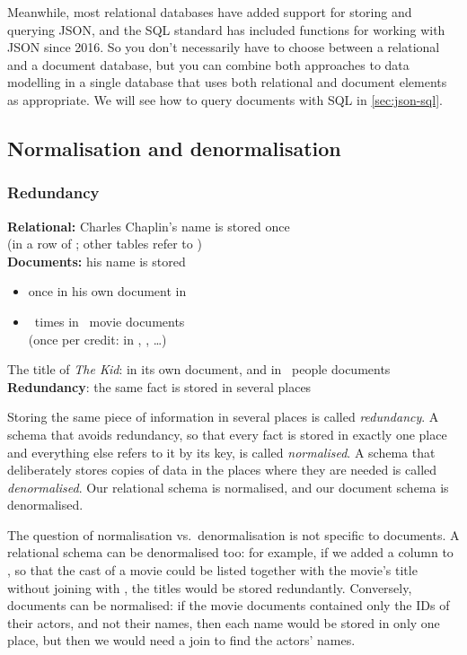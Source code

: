 Meanwhile, most relational databases have added support for storing and querying JSON, and the SQL standard has included functions for working with JSON since 2016.
So you don't necessarily have to choose between a relational and a document database, but you can combine both approaches to data modelling in a single database that uses both relational and document elements as appropriate.
We will see how to query documents with SQL in \autoref{sec:json-sql}.

\subsection{Normalisation and denormalisation}\label{sec:normalisation}

\begin{frame}
    \label{s:redundancy}
    \frametitle{Redundancy}
    \textbf{Relational:} Charles Chaplin's name is stored once\\
    (in a row of ; other tables refer to )\\[1em]\pause
    \textbf{Documents:} his name is stored
    \begin{itemize}
        \item once in his own document in 
        \item \jsonchaplinmentions\ times in \jsonchaplindocs\ movie documents\\
            (once per credit: in , , \dots)\\[0.5em]
    \end{itemize}
    The title of \emph{The Kid}: in its own document, and in \jsonkiddocs\ people documents\\[1em]\pause
    \textbf{Redundancy}: the same fact is stored in several places
\end{frame}
\label{l:redundancy}

Storing the same piece of information in several places is called \emph{redundancy}.
A schema that avoids redundancy, so that every fact is stored in exactly one place and everything else refers to it by its key, is called \emph{normalised}.
A schema that deliberately stores copies of data in the places where they are needed is called \emph{denormalised}.
Our relational schema is normalised, and our document schema is denormalised.

The question of normalisation vs.\ denormalisation is not specific to documents.
A relational schema can be denormalised too: for example, if we added a  column to , so that the cast of a movie could be listed together with the movie's title without joining with , the titles would be stored redundantly.
Conversely, documents can be normalised: if the movie documents contained only the IDs of their actors, and not their names, then each name would be stored in only one place, but then we would need a join to find the actors' names.

